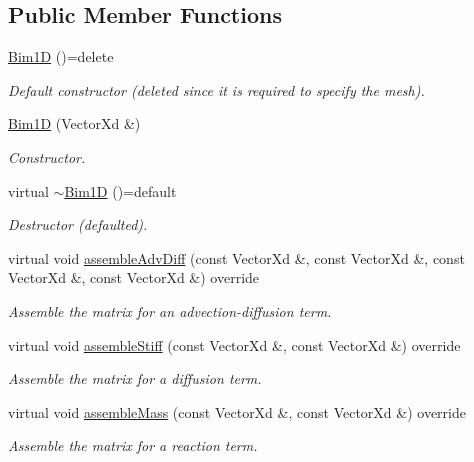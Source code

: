 \subsection*{Public Member Functions}
\begin{DoxyCompactItemize}
\item 
\hypertarget{classBim1D_aaa2cb4f70036268c64965b09be0ee721}{\hyperlink{classBim1D_aaa2cb4f70036268c64965b09be0ee721}{Bim1\-D} ()=delete}\label{classBim1D_aaa2cb4f70036268c64965b09be0ee721}

\begin{DoxyCompactList}\small\item\em Default constructor (deleted since it is required to specify the mesh). \end{DoxyCompactList}\item 
\hyperlink{classBim1D_a42ae4a690e1f5d12202a7da216ed437f}{Bim1\-D} (Vector\-Xd \&)
\begin{DoxyCompactList}\small\item\em Constructor. \end{DoxyCompactList}\item 
\hypertarget{classBim1D_a2fa6995307b37f25bf3c047a959e8b5a}{virtual \hyperlink{classBim1D_a2fa6995307b37f25bf3c047a959e8b5a}{$\sim$\-Bim1\-D} ()=default}\label{classBim1D_a2fa6995307b37f25bf3c047a959e8b5a}

\begin{DoxyCompactList}\small\item\em Destructor (defaulted). \end{DoxyCompactList}\item 
virtual void \hyperlink{classBim1D_a70f740fd42f21c2284f4c67c94b36ef3}{assemble\-Adv\-Diff} (const Vector\-Xd \&, const Vector\-Xd \&, const Vector\-Xd \&, const Vector\-Xd \&) override
\begin{DoxyCompactList}\small\item\em Assemble the matrix for an advection-\/diffusion term. \end{DoxyCompactList}\item 
virtual void \hyperlink{classBim1D_ad16a59cddd56a41185163574507dfdef}{assemble\-Stiff} (const Vector\-Xd \&, const Vector\-Xd \&) override
\begin{DoxyCompactList}\small\item\em Assemble the matrix for a diffusion term. \end{DoxyCompactList}\item 
virtual void \hyperlink{classBim1D_aa99f58d5ec1d53891b11ea81adec6b92}{assemble\-Mass} (const Vector\-Xd \&, const Vector\-Xd \&) override
\begin{DoxyCompactList}\small\item\em Assemble the matrix for a reaction term. \end{DoxyCompactList}\end{DoxyCompactItemize}
